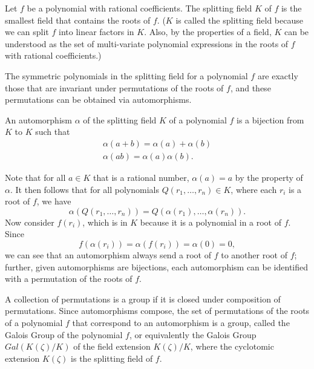 \documentclass[../main.tex]{subfiles}
\begin{document}
\begin{definition}
Let $f$ be a polynomial with rational coefficients. The splitting field\reversemarginpar
{} $K$ of $f$ is the smallest field that contains the roots of $f$. 
($K$ is called the splitting field because we can split $f$ into linear factors in $K$. Also, by the properties of a field, $K$ can be understood as the set of multi-variate polynomial expressions in the roots of $f$ with rational coefficients.)
\end{definition}

The symmetric polynomials in the splitting field for a polynomial $f$ are exactly those that are invariant under permutations of the roots of $f$, and 
these permutations can be obtained via automorphisms.

\begin{definition}
An automorphism\reversemarginpar{} $\alpha$ of the splitting field $K$ of a polynomial $f$ is a bijection from $K$ to $K$ such that
\begin{gather*}
    \alpha(a + b) = \alpha(a) + \alpha(b) \\
    \alpha(ab) = \alpha(a) \alpha(b).
\end{gather*}
\end{definition}
Note that for all $a \in K$ that is a rational number, $\alpha(a) = a$ by the property of $\alpha$.
It then follows that for all polynomials $Q(r_1,\ldots,r_n) \in K$, where each $r_i$ is a root of $f$, we have
\[ \alpha(Q(r_1,\ldots,r_n)) = Q(\alpha(r_1),\ldots,\alpha(r_n)). \]
Now consider $f(r_i)$, which is in $K$ because it is a polynomial in a root of $f$.
Since 
\[ f(\alpha(r_i)) = \alpha(f(r_i)) = \alpha(0) = 0, \]
we can see that an automorphism always send a root of $f$ to another root of $f$; further, given automorphisms are bijections, each automorphism can be identified with a permutation of the roots of $f$.

A collection of permutations is a group if it is closed under composition of permutations. Since automorphisms compose, the set of permutations of the roots of a polynomial $f$ that correspond to an automorphism is a group, called the Galois Group of the polynomial $f$, or equivalently the Galois Group $Gal(K(\zeta)/K)$ of the field extension $K(\zeta)/K$, where the cyclotomic extension $K(\zeta)$ is the splitting field of $f$.
\end{document}
